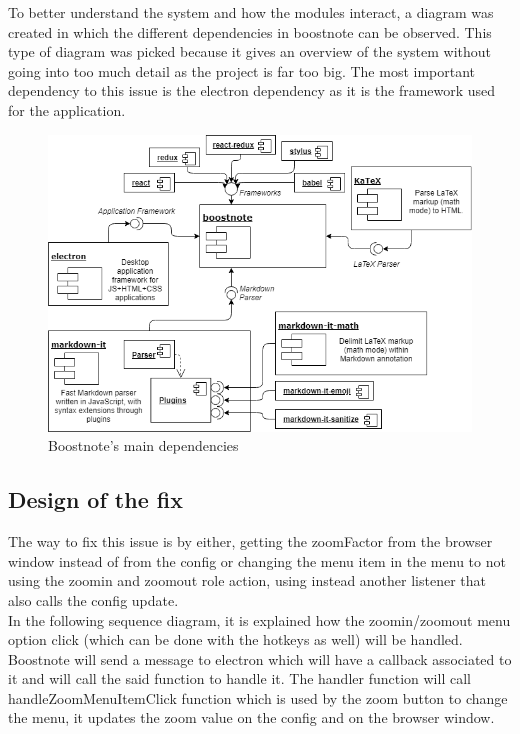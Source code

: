 \documentclass[main.tex]{subfiles}
\begin{document}
To better understand the system and how the modules interact, a diagram was created in which the different dependencies in boostnote can be observed. This type of diagram was picked because it gives an overview of the system without going into too much detail as the project is far too big. The most important dependency to this issue is the electron dependency as it is the framework used for the application.

\begin{figure}[h]
\includegraphics[scale=0.6]{images/diagram.png}
\centering
\caption{Boostnote's main dependencies}
\label{fig:boostnotearch}
\end{figure}
\clearpage

\subsection{Design of the fix}
\label{subsec:design2554}

The way to fix this issue is by either, getting the zoomFactor from the browser window instead of from the config or changing the menu item in the menu to not using the zoomin and zoomout role action, using instead another listener that also calls the config update.\\

In the following sequence diagram, it is explained how the zoomin/zoomout menu option click (which can be done with the hotkeys as well) will be handled. Boostnote will send a message to electron which will have a callback associated to it and will call the said function to handle it. The handler function will call handleZoomMenuItemClick function which is used by the zoom button to change the menu, it updates the zoom value on the config and on the browser window.\\
\end{document}
